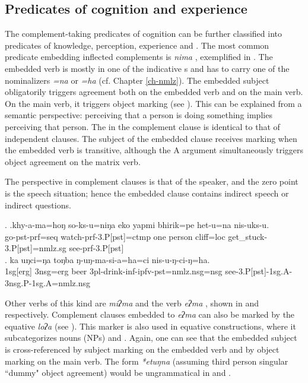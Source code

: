 \subsection{Predicates of cognition and experience}\label{cognition-pred}

The complement-taking predicates of cognition can be further classified into predicates of knowledge, perception, experience and . 
 The most common predicate embedding inflected complements is \emph{nima} , exemplified in \Next. The embedded verb is mostly in one of the indicative s and has to carry one of the nominalizers \emph{=na} or \emph{=ha} (cf. Chapter \ref{ch-nmlz}). The embedded subject obligatorily triggers agreement both on the embedded verb and on the main verb. On the main verb, it triggers object marking (see \Next[b]). This can be explained from a semantic perspective: perceiving that a person is doing something implies perceiving that person. The  in the complement clause is identical to that of independent clauses. The subject of the embedded clause receives   marking when the embedded verb is transitive, although the A argument simultaneously triggers object agreement on the matrix verb. 
 
 The perspective in complement clauses is that of the speaker, and the zero point is the speech situation; hence the embedded clause contains indirect speech or indirect questions.

\ex. \ag.khy-a-ma=hoŋ so-ks-u=niŋa    eko yapmi  bhirik=pe    het-u=na   nis-uks-u.\\
go{\sc -pst-prf=seq}  watch{\sc -prf-3.P[pst]=ctmp} one person cliff{\sc =loc} get\_stuck{\sc -3.P[pst]=nmlz.sg} see{\sc -prf-3.P[pst]}\\
 
\bg. ka uŋci=ŋa toŋba ŋ-uŋ-ma-si-a=ha=ci nis-u-ŋ-ci-ŋ=ha.\\
{\sc 1sg[erg]} {\sc 3nsg=erg} beer  {\sc 3pl}-drink-{\sc inf-ipfv-pst=nmlz.nsg=nsg} see{\sc -3.P[pst]-1sg.A-3nsg.P-1sg.A=nmlz.nsg}\\


Other verbs of this kind are  \emph{miʔma}  and the  verb \emph{eʔma} , shown in \Next and \NNext[a] respectively.  Complement clauses embedded to  \emph{eʔma} can also be marked by the equative   \emph{loʔa}  (see \NNext[b]). This marker is also used in equative constructions, where it subcategorizes nouns (NPs) and .  Again, one can see that the embedded subject is cross-referenced by subject marking on the embedded verb and by object marking on the main verb. The form \emph{*etuŋna} (assuming third person singular “dummy" object agreement) would be ungrammatical in \NNext[b] and \NNext[c]. 

